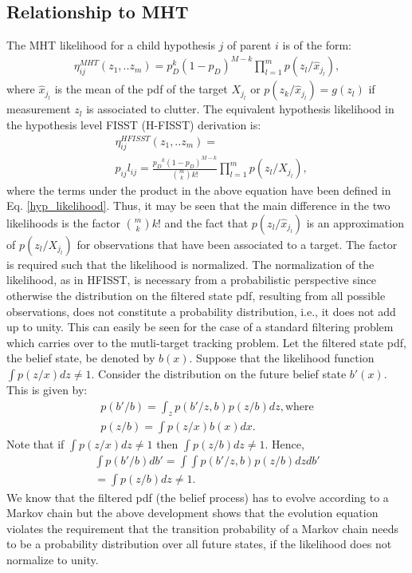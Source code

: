 \documentclass[10pt, conference]{IEEEtran}
\begin{document}
\subsection{Relationship to MHT} 
 The MHT likelihood for a child hypothesis $j$ of parent $i$ is of the form:
\begin{align}
\eta_{ij}^{MHT}(z_1,..z_m) = p_D^k (1-p_D)^{M-k} \prod_{l=1}^m p(z_l/ \hat{x}_{j_l}),
\end{align}
where $\hat{x}_{j_l}$ is the mean of the pdf of the target $X_{j_l}$ or $p(z_k/ \hat{x}_{j_l}) = g(z_l)$ if measurement  $z_l$ is associated to clutter. The equivalent hypothesis likelihood in the hypothesis level FISST (H-FISST) derivation is:
\begin{align}
&\eta_{ij}^{HFISST}(z_1,..z_m) = \nonumber\\
&p_{ij} l_{ij}=  \frac{{p_D}^k (1-p_D)^{M-k}}{{m \choose k}k!}\prod_{l=1}^m p(z_l/ X_{j_l}),
\end{align}
where the terms under the product in the above equation have been defined in Eq. \ref{hyp_likelihood}. Thus, it may be seen that the main difference in the two likelihoods is the factor ${m \choose k} k!$ and the fact that $p(z_l/ \hat{x}_{j_l})$ is an approximation of $p(z_l/ X_{j_l})$ for observations that have been associated to a target. The factor is required such that the likelihood is normalized. The normalization of the likelihood, as in HFISST, is necessary from a probabilistic perspective since otherwise the distribution on the filtered state pdf, resulting from all possible observations, does not constitute a probability distribution, i.e., it does not add up to unity. This can easily be seen for the case of a standard filtering problem which carries over to the mutli-target tracking problem. Let the filtered state pdf, the belief state, be denoted by $b(x)$. Suppose that the likelihood function $\int p(z/x) dz \neq 1$. Consider the distribution on the future belief state $b'(x)$. This is given by:
\begin{align}
p(b'/b) = \int_z p(b'/z,b) p(z/b) dz, \mbox{where} \nonumber\\
p(z/b) = \int p(z/x) b(x) dx.
\end{align}
Note that if $\int p(z/x)dz \neq 1$ then $\int p(z/b) dz \neq 1$. Hence,
\begin{align}
\int p(b'/b) db' = \int\int p(b'/z,b) p(z/b) dz db' \nonumber\\
=  \int p(z/b) dz \neq 1.
\end{align}
We know that the filtered pdf (the belief process) has to evolve according to a Markov chain \cite{bertsekas1, kumar1} but the above development shows that the evolution equation violates the requirement that the transition probability of a Markov chain needs to be a probability distribution over all future states,  if the likelihood does not normalize to unity.
\end{document}
